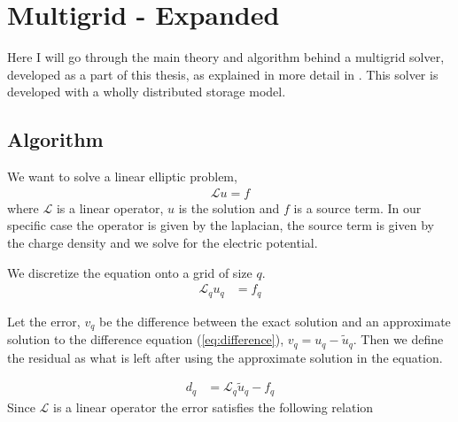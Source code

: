 
\section{Multigrid - Expanded}
	\label{sec:multigrid}
	Here I will go through the main theory and
	algorithm behind a multigrid solver, developed as a part of this thesis,
	as explained in more detail in \citep{press_numerical_1988,trottenberg_multigrid_2000}.
	This solver is developed with a wholly distributed storage model.

	\subsection{Algorithm}
	We want to solve a linear elliptic problem,
		\begin{align}
			\mathcal{L} u = f
		\end{align}
	where \(\mathcal{L}\) is a linear operator, \(u\) is the solution and \(f\) is
	a source term. In our specific case the operator is given by the laplacian, the
	source term is given by the charge density and we solve for the electric potential.

	We discretize the equation onto a grid of size \(q\).
	\begin{align}
		\mathcal{L}_q u_q &= f_q \label{eq:difference}
	\end{align}

	Let the error, \(v_q\) be the difference between the exact solution and an approximate
	solution to the difference equation (\ref{eq:difference}), \( v_q = u_q - \tilde{u}_q \).
	Then we define the residual as what is left after using the approximate solution
	in the equation.

	\begin{align}
		d_q &= \mathcal{L}_q \tilde{u}_q - f_q
	\end{align}
	Since \(\mathcal{L}\) is a linear operator the error satisfies the following relation

